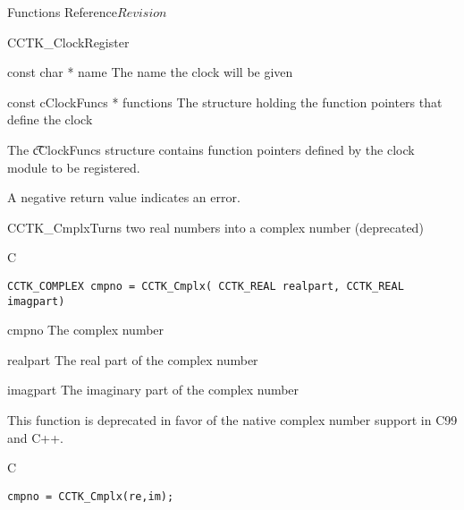 \begin{cactuspart}{ Functions Reference}{}{$Revision$}
\begin{FunctionDescription}{CCTK\_ClockRegister}
\begin{ParameterSection}
\begin{Parameter}{const char * name}
The name the clock will be given
\end{Parameter}

\begin{Parameter}{const cClockFuncs * functions}
The structure holding the function pointers that define the clock
\end{Parameter}
\end{ParameterSection}

\begin{Discussion}
The {\t cClockFuncs} structure contains function pointers defined by
the clock module to be registered.
\end{Discussion}

\begin{ErrorSection}
\begin{Error}{}
A negative return value indicates an error.
\end{Error}
\end{ErrorSection}
\end{FunctionDescription}


\begin{FunctionDescription}{CCTK\_Cmplx}{Turns two real numbers into a complex number (deprecated)}
\label{CCTK-Cmplx}
\begin{SynopsisSection}
\begin{Synopsis}{C}
\begin{verbatim}CCTK_COMPLEX cmpno = CCTK_Cmplx( CCTK_REAL realpart, CCTK_REAL imagpart)\end{verbatim}
\end{Synopsis}
\end{SynopsisSection}
\begin{ParameterSection}
\begin{Parameter}{cmpno}
The complex number
\end{Parameter}
\begin{Parameter}{realpart}
The real part of the complex number
\end{Parameter}
\begin{Parameter}{imagpart}
The imaginary part of the complex number
\end{Parameter}
\end{ParameterSection}

\begin{Discussion}
This function is deprecated in favor of the native complex number support in
C99 and C++.
\end{Discussion}
\begin{ExampleSection}
\begin{Example}{C}
\begin{verbatim}
cmpno = CCTK_Cmplx(re,im);
\end{verbatim}
\end{Example}
\end{ExampleSection}
\end{FunctionDescription}



\end{cactuspart}
